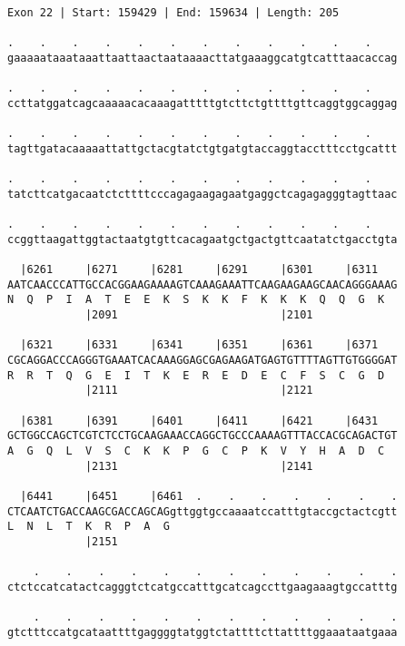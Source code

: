 \documentclass{article}
\begin{document}
\begin{Verbatim}
Exon 22 | Start: 159429 | End: 159634 | Length: 205
 
.    .    .    .    .    .    .    .    .    .    .    .    
gaaaaataaataaattaattaactaataaaacttatgaaaggcatgtcatttaacaccag
                                                            
.    .    .    .    .    .    .    .    .    .    .    .    
ccttatggatcagcaaaaacacaaagatttttgtcttctgttttgttcaggtggcaggag
                                                            
.    .    .    .    .    .    .    .    .    .    .    .    
tagttgatacaaaaattattgctacgtatctgtgatgtaccaggtacctttcctgcattt
                                                            
.    .    .    .    .    .    .    .    .    .    .    .    
tatcttcatgacaatctcttttcccagagaagagaatgaggctcagagagggtagttaac
                                                            
.    .    .    .    .    .    .    .    .    .    .    .    
ccggttaagattggtactaatgtgttcacagaatgctgactgttcaatatctgacctgta
                                                            
  |6261     |6271     |6281     |6291     |6301     |6311   
AATCAACCCATTGCCACGGAAGAAAAGTCAAAGAAATTCAAGAAGAAGCAACAGGGAAAG
N  Q  P  I  A  T  E  E  K  S  K  K  F  K  K  K  Q  Q  G  K  
            |2091                         |2101             
  
  |6321     |6331     |6341     |6351     |6361     |6371   
CGCAGGACCCAGGGTGAAATCACAAAGGAGCGAGAAGATGAGTGTTTTAGTTGTGGGGAT
R  R  T  Q  G  E  I  T  K  E  R  E  D  E  C  F  S  C  G  D  
            |2111                         |2121             
  
  |6381     |6391     |6401     |6411     |6421     |6431   
GCTGGCCAGCTCGTCTCCTGCAAGAAACCAGGCTGCCCAAAAGTTTACCACGCAGACTGT
A  G  Q  L  V  S  C  K  K  P  G  C  P  K  V  Y  H  A  D  C  
            |2131                         |2141             
  
  |6441     |6451     |6461  .    .    .    .    .    .    .
CTCAATCTGACCAAGCGACCAGCAGgttggtgccaaaatccatttgtaccgctactcgtt
L  N  L  T  K  R  P  A  G                                   
            |2151                                           
  
    .    .    .    .    .    .    .    .    .    .    .    .
ctctccatcatactcagggtctcatgccatttgcatcagccttgaagaaagtgccatttg
                                                            
    .    .    .    .    .    .    .    .    .    .    .    .
gtctttccatgcataattttgaggggtatggtctattttcttattttggaaataatgaaa
                                                            

\end{Verbatim}
\end{document}
